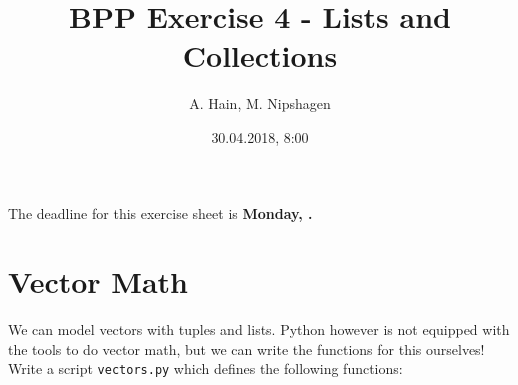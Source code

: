 


\title{BPP Exercise 4 - Lists and Collections}
\author{A. Hain, M. Nipshagen}
\date{30.04.2018, 8:00}

\makeatletter
\let\thetitle\@title
\let\theauthor\@author
\let\thedate\@date
\makeatother

\renewcommand\sol[1]{}



The deadline for this exercise sheet is \textbf{Monday, \thedate.}
%
%
\section{Vector Math}
We can model vectors with tuples and lists. Python however is not equipped with the tools to do vector math, but we can write the functions for this ourselves!\\
Write a script \texttt{vectors.py} which defines the following functions:
